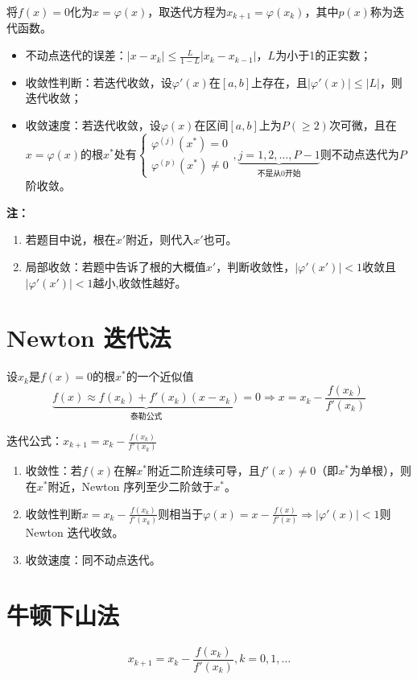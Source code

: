 \documentclass[UTF8,a4paper,11pt,oneside]{ctexbook}
\begin{document}
将\(f(x)=0\)化为\(x=\varphi(x)\)，取迭代方程为\(x_{k+1}=\varphi(x_k)\)，其中\(p(x)\)称为迭代函数。
\begin{itemize}
    \item 不动点迭代的误差：\(|x-x_k|\leq\frac{L}{1-L}|x_k-x_{k-1}|\)，\(L\)为小于1的正实数；
    \item 收敛性判断：若迭代收敛，设\(\varphi'(x)\)在\([a,b]\)上存在，且\(|\varphi'(x)|\leq|L|\)，则迭代收敛；
    \item 收敛速度：若迭代收敛，设\(\varphi(x)\)在区间\([a,b]\)上为\(P(\geq2)\)次可微，且在\(x=\varphi(x)\)的根\(x^*\)处有\(\begin{cases}
        \varphi^{(j)}(x^*)=0\\
        \varphi^{(p)}(x^*)\neq0
    \end{cases},\underbrace{j=1,2,\ldots,P-1}_\text{不是从0开始}\)则不动点迭代为\(P\)阶收敛。
\end{itemize}
\textbf{注：}
\begin{enumerate}
    \item 若题目中说，根在\(x'\)附近，则代入\(x'\)也可。
    \item 局部收敛：若题中告诉了根的大概值\(x'\)，判断收敛性，\(|\varphi'(x')|<1\)收敛且\(|\varphi'(x')|<1\)越小,收敛性越好。
\end{enumerate}

\section{Newton 迭代法}

设\(x_k\)是\(f(x)=0\)的根\(x^*\)的一个近似值
\[
\underbrace{f(x)\approx f(x_k)+f'(x_k)(x-x_k)}_{\text{泰勒公式}}=0\Rightarrow x=x_k-\frac{f(x_k)}{f'(x_k)}
\]

迭代公式：\(x_{k+1}=x_{k}-\frac{f(x_k)}{f'(x_k)}\)
\begin{enumerate}
    \item 收敛性：若\(f(x)\)在解\(x^*\)附近二阶连续可导，且\(f'(x)\neq0\)（即\(x^*\)为单根），则在\(x^*\)附近，Newton 序列至少二阶敛于\(x^*\)。
    \item 收敛性判断\(x=x_k-\frac{f(x_k)}{f'(x_k)}\)则相当于\(\varphi(x)=x-\frac{f(x)}{f'(x)}\Rightarrow|\varphi'(x)|<1\)则 Newton 迭代收敛。
    \item 收敛速度：同不动点迭代。
\end{enumerate}

\section{牛顿下山法}
\[
x_{k+1}=x_k-\frac{f(x_k)}{f'(x_k)},k=0,1,\ldots
\]
\end{document}
